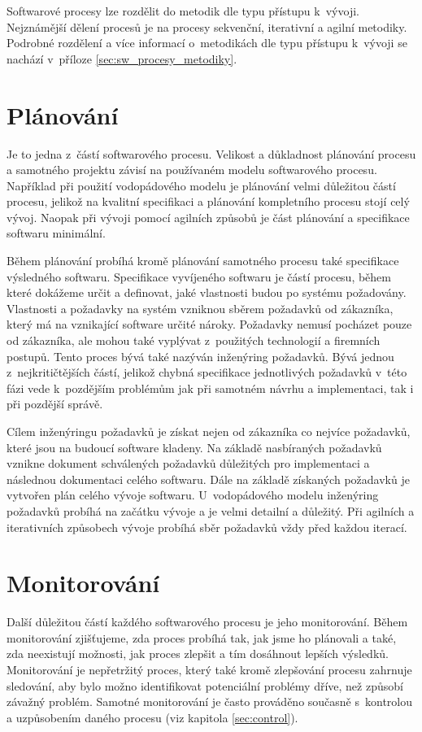 \documentclass[czech,master]{diploma}
\begin{document}
Softwarové procesy lze rozdělit do metodik dle typu přístupu k~vývoji. Nejznámější dělení procesů je na procesy sekvenční, iterativní a agilní metodiky. Podrobné rozdělení a více informací o~metodikách dle typu přístupu k~vývoji se nachází v~příloze \ref{sec:sw_procesy_metodiky}.

\section{Plánování}
Je to jedna z~částí softwarového procesu. Velikost a důkladnost plánování procesu a samotného projektu závisí na používaném modelu softwarového procesu. Například při použití vodopádového modelu je plánování velmi důležitou částí procesu, jelikož na kvalitní specifikaci a plánování kompletního procesu stojí celý vývoj. Naopak při vývoji pomocí agilních způsobů je část plánování a specifikace softwaru minimální.

Během plánování probíhá kromě plánování samotného procesu také specifikace výsledného softwaru. Specifikace vyvíjeného softwaru je částí procesu, během které dokážeme určit a definovat, jaké vlastnosti budou po systému požadovány. Vlastnosti a požadavky na systém vzniknou sběrem požadavků od zákazníka, který má na vznikající software určité nároky. Požadavky nemusí pocházet pouze od zákazníka, ale mohou také vyplývat z~použitých technologií a firemních postupů. Tento proces bývá také nazýván inženýring požadavků. Bývá jednou z~nejkritičtějších částí, jelikož chybná specifikace jednotlivých požadavků v~této fázi vede k~pozdějším problémům jak při samotném návrhu a implementaci, tak i při pozdější správě.

Cílem inženýringu požadavků je získat nejen od zákazníka co nejvíce požadavků, které jsou na budoucí software kladeny. Na základě nasbíraných požadavků vznikne dokument schválených požadavků důležitých pro implementaci a následnou dokumentaci celého softwaru. Dále na základě získaných požadavků je vytvořen plán celého vývoje softwaru. U~vodopádového modelu inženýring požadavků probíhá na začátku vývoje a je velmi detailní a důležitý. Při agilních a iterativních způsobech vývoje probíhá sběr požadavků vždy před každou iterací.

\section{Monitorování}
Další důležitou částí každého softwarového procesu je jeho monitorování. Během monitorování zjišťujeme, zda proces probíhá tak, jak jsme ho plánovali a také, zda neexistují možnosti, jak proces zlepšit a tím dosáhnout lepších výsledků. Monitorování je nepřetržitý proces, který také kromě zlepšování procesu zahrnuje sledování, aby bylo možno identifikovat potenciální problémy dříve, než způsobí závažný problém. Samotné monitorování je často prováděno současně s~kontrolou a uzpůsobením daného procesu (viz kapitola \ref{sec:control}).
\end{document}

